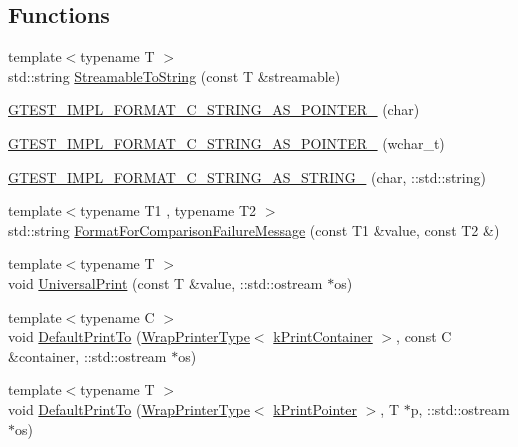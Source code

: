 \subsection*{Functions}
\begin{DoxyCompactItemize}
\item 
{\footnotesize template$<$typename T $>$ }\\std\+::string \hyperlink{namespacetesting_1_1internal_aad4beed95d0846e6ffc5da0978ef3bb9}{Streamable\+To\+String} (const T \&streamable)
\item 
\hyperlink{namespacetesting_1_1internal_a3682f962ae0ec1c0eca6444ca0a09e91}{G\+T\+E\+S\+T\+\_\+\+I\+M\+P\+L\+\_\+\+F\+O\+R\+M\+A\+T\+\_\+\+C\+\_\+\+S\+T\+R\+I\+N\+G\+\_\+\+A\+S\+\_\+\+P\+O\+I\+N\+T\+E\+R\+\_\+} (char)
\item 
\hyperlink{namespacetesting_1_1internal_a85e08f00d443221e529a0a85a90fbaeb}{G\+T\+E\+S\+T\+\_\+\+I\+M\+P\+L\+\_\+\+F\+O\+R\+M\+A\+T\+\_\+\+C\+\_\+\+S\+T\+R\+I\+N\+G\+\_\+\+A\+S\+\_\+\+P\+O\+I\+N\+T\+E\+R\+\_\+} (wchar\+\_\+t)
\item 
\hyperlink{namespacetesting_1_1internal_aeac30230dcc362221bdd07d61eaa4ec1}{G\+T\+E\+S\+T\+\_\+\+I\+M\+P\+L\+\_\+\+F\+O\+R\+M\+A\+T\+\_\+\+C\+\_\+\+S\+T\+R\+I\+N\+G\+\_\+\+A\+S\+\_\+\+S\+T\+R\+I\+N\+G\+\_\+} (char, \+::std\+::string)
\item 
{\footnotesize template$<$typename T1 , typename T2 $>$ }\\std\+::string \hyperlink{namespacetesting_1_1internal_a91ab078f10adc669f09b7f604975c518}{Format\+For\+Comparison\+Failure\+Message} (const T1 \&value, const T2 \&)
\item 
{\footnotesize template$<$typename T $>$ }\\void \hyperlink{namespacetesting_1_1internal_a30708fa2bacf11895b03bdb21eb72309}{Universal\+Print} (const T \&value, \+::std\+::ostream $\ast$os)
\item 
{\footnotesize template$<$typename C $>$ }\\void \hyperlink{namespacetesting_1_1internal_a2e96c98d5bd8ee4a1b92f8e3cde7dd40}{Default\+Print\+To} (\hyperlink{structtesting_1_1internal_1_1WrapPrinterType}{Wrap\+Printer\+Type}$<$ \hyperlink{namespacetesting_1_1internal_a17fb8f0125fa92404a249ed38a43faa4a945a19e59155ce1d335e8c3bcbdf61db}{k\+Print\+Container} $>$, const C \&container, \+::std\+::ostream $\ast$os)
\item 
{\footnotesize template$<$typename T $>$ }\\void \hyperlink{namespacetesting_1_1internal_a074522dd8d77d61878a042b8d05cc64a}{Default\+Print\+To} (\hyperlink{structtesting_1_1internal_1_1WrapPrinterType}{Wrap\+Printer\+Type}$<$ \hyperlink{namespacetesting_1_1internal_a17fb8f0125fa92404a249ed38a43faa4a8eaa6fff4a58832b30027df49f73dcbf}{k\+Print\+Pointer} $>$, T $\ast$p, \+::std\+::ostream $\ast$os)

\end{DoxyCompactItemize}
